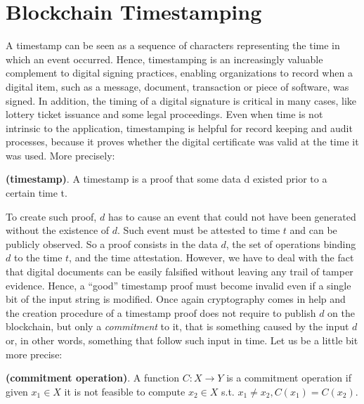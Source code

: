 \bigskip
\section{Blockchain Timestamping}
\label{sec:timestamping}
A timestamp can be seen as a sequence of characters representing the time in which an event occurred. Hence, timestamping is an increasingly valuable complement to digital signing practices, enabling organizations to record when a digital item, such as a message, document, transaction or piece of software, was signed. In addition, the timing of a digital signature is critical in many cases, like lottery ticket issuance and some legal proceedings. Even when time is not intrinsic to the application, timestamping is helpful for record keeping and audit processes, because it proves whether the digital certificate was valid at the time it was used. More precisely:

\begin{mydef}{\bf (timestamp)}.
    A timestamp is a proof that some data d existed prior to a certain time t.
\end{mydef}

\bigskip
\noindent
To create such proof, $d$ has to cause an event that could not have been
generated without the existence of $d$. Such event must be attested to time $t$ and
can be publicly observed. So a proof consists in the data $d$, the set of operations binding $d$ to the time $t$, and the time attestation. However, we have to deal with the fact that digital documents can be easily falsified without leaving any trail of tamper evidence. Hence, a \enquote{good} timestamp proof must become invalid even if a single bit of the input string is modified. Once again cryptography comes in help and the creation procedure of a timestamp proof does not require to publish $d$ on the blockchain, but only a \textit{commitment} to it, that is something caused by the input $d$ or, in other words, something that follow such input in time. Let us be a little bit more precise:
\begin{mydef}{\bf (commitment operation)}.
    A function $C: X \rightarrow Y$ is a commitment operation if given $x_{1} \in X$ it is not feasible to compute $x_{2} \in X$ s.t. $x_{1} \neq x_{2}, C(x_{1}) = C(x_{2})$.
\end{mydef}

